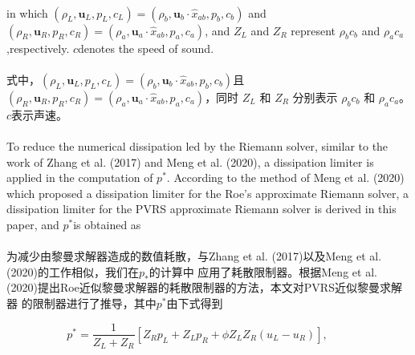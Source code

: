 \documentclass[UTF8]{ctexart}
\begin{document}
\paragraph{\quad}in which $(\rho_L, \mathbf{u}_L, p_L, c_L) = (\rho_b, \mathbf{u}_b \cdot \hat{x}_{ab}, p_b, c_b)$ and 
                $(\rho_R, \mathbf{u}_R, p_R, c_R) = (\rho_a, \mathbf{u}_a \cdot \hat{x}_{ab}, p_a, c_a)$, and $Z_L$ and
                $Z_R$ represent $\rho_b c_b$ and $\rho_a c_a$,respectively. $c $denotes the speed of sound.
\paragraph{\quad}式中，$(\rho_L, \mathbf{u}_L, p_L, c_L) = (\rho_b, \mathbf{u}_b \cdot \hat{x}_{ab}, p_b, c_b)$且
                $(\rho_R, \mathbf{u}_R, p_R, c_R) = (\rho_a, \mathbf{u}_a \cdot \hat{x}_{ab}, p_a, c_a)$，同时 $Z_L$ 和
                $Z_R$ 分别表示 $\rho_b c_b$ 和 $\rho_a c_a$。$c$表示声速。
            
\paragraph{\quad}To reduce the numerical dissipation led by the Riemann solver, similar to the work 
                of Zhang et al. (2017) and Meng et al. (2020), a dissipation limiter is applied in the 
                computation of $p^*$. According to the method of Meng et al. (2020) which proposed a 
                dissipation limiter for the Roe's approximate Riemann solver, a dissipation limiter 
                for the PVRS approximate Riemann solver is derived in this paper, and $p^*$is obtained as
\paragraph{\quad}为减少由黎曼求解器造成的数值耗散，与Zhang et al. (2017)以及Meng et al. (2020)的工作相似，我们在$p_*$的计算中
                应用了耗散限制器。根据Meng et al. (2020)提出Roe近似黎曼求解器的耗散限制器的方法，本文对PVRS近似黎曼求解器
                的限制器进行了推导，其中$p^*$由下式得到
    
\begin{equation}
   p^*=\frac{1}{Z_L+Z_R}[Z_R p_L+Z_L p_R + \phi Z_L Z_R(u_L - u_R)], \qquad 
\end{equation}
\end{document}
